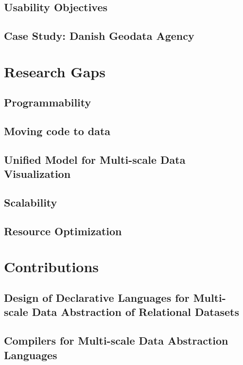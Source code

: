 \documentclass[11pt, oneside]{report}   	%
\begin{document}
\subsection{Usability Objectives}
\subsection{Case Study: Danish Geodata Agency}

\section{Research Gaps}
\subsection{Programmability}
\subsection{Moving code to data}
\subsection{Unified Model for Multi-scale Data Visualization}
\subsection{Scalability}
\subsection{Resource Optimization}


\section{Contributions}
\subsection{Design of Declarative Languages for Multi-scale Data Abstraction of Relational Datasets}
\subsection{Compilers for Multi-scale Data Abstraction Languages}
\end{document}
